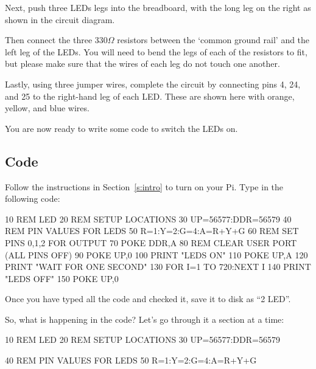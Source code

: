Next, push three LEDs legs into the breadboard, with the long leg on the right as shown in the circuit diagram.

Then connect the three 330$\Omega$ resistors between the `common ground rail' and the left leg of the LEDs.  You will need to bend the legs of each of the resistors to fit, but please make sure that the wires of each leg do not touch one another.

Lastly, using three jumper wires, complete the circuit by connecting pins 4, 24, and 25 to the right-hand leg of each LED.  These are shown here with orange, yellow, and blue wires.

You are now ready to write some code to switch the LEDs on.

\subsection*{Code}

Follow the instructions in Section~\ref{s:intro} to turn on your Pi.  Type in the following code:
\begin{basic}
10 REM LED
20 REM SETUP LOCATIONS
30 UP=56577:DDR=56579
40 REM PIN VALUES FOR LEDS
50 R=1:Y=2:G=4:A=R+Y+G
60 REM SET PINS 0,1,2 FOR OUTPUT
70 POKE DDR,A
80 REM CLEAR USER PORT (ALL PINS OFF)
90 POKE UP,0
100 PRINT "LEDS ON"
110 POKE UP,A
120 PRINT "WAIT FOR ONE SECOND"
130 FOR I=1 TO 720:NEXT I
140 PRINT "LEDS OFF"
150 POKE UP,0
\end{basic}

Once you have typed all the code and checked it, save it to disk as ``2 LED''.

So, what is happening in the code?  Let's go through it a section at a time:

\begin{basic}
10 REM LED
20 REM SETUP LOCATIONS
30 UP=56577:DDR=56579
\end{basic}


\begin{basic}
40 REM PIN VALUES FOR LEDS
50 R=1:Y=2:G=4:A=R+Y+G
\end{basic}

